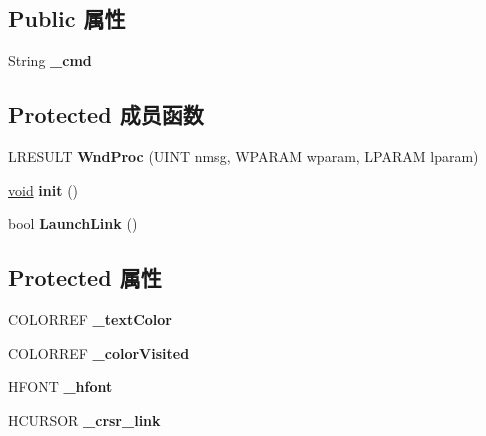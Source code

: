 \subsection*{Public 属性}
\begin{DoxyCompactItemize}
\item 
\mbox{\label{struct_hyperlink_ctrl_a6233bc5fb38fa04587ac876144234178}} 
String {\bfseries \+\_\+cmd}
\end{DoxyCompactItemize}
\subsection*{Protected 成员函数}
\begin{DoxyCompactItemize}
\item 
\mbox{\label{struct_hyperlink_ctrl_a1a4c7320d8bf16a10c2e736b473a7880}} 
L\+R\+E\+S\+U\+LT {\bfseries Wnd\+Proc} (U\+I\+NT nmsg, W\+P\+A\+R\+AM wparam, L\+P\+A\+R\+AM lparam)
\item 
\mbox{\label{struct_hyperlink_ctrl_a756ed75d6ae55082eaa77f4e6c6245d2}} 
\hyperlink{interfacevoid}{void} {\bfseries init} ()
\item 
\mbox{\label{struct_hyperlink_ctrl_a0219a1f266c8a00bd167cc863e903327}} 
bool {\bfseries Launch\+Link} ()
\end{DoxyCompactItemize}
\subsection*{Protected 属性}
\begin{DoxyCompactItemize}
\item 
\mbox{\label{struct_hyperlink_ctrl_a51f532482501951763be796cffe58b84}} 
C\+O\+L\+O\+R\+R\+EF {\bfseries \+\_\+text\+Color}
\item 
\mbox{\label{struct_hyperlink_ctrl_a86b5e9490ff74a2df583e3e252e62368}} 
C\+O\+L\+O\+R\+R\+EF {\bfseries \+\_\+color\+Visited}
\item 
\mbox{\label{struct_hyperlink_ctrl_ad00d79b5dabaed980d261cfece7d1c67}} 
H\+F\+O\+NT {\bfseries \+\_\+hfont}
\item 
\mbox{\label{struct_hyperlink_ctrl_a0d001d95b0165b97b7508eaf2a6f5103}} 
H\+C\+U\+R\+S\+OR {\bfseries \+\_\+crsr\+\_\+link}
\end{DoxyCompactItemize}
